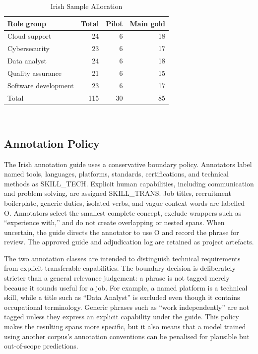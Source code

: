 \documentclass[conference]{IEEEtran}
\begin{document}
\begin{table}[!t]
\caption{Irish Sample Allocation}
\label{tab:corpus}
\centering
\small
\begin{tabular}{lrrr}
\toprule
Role group & Total & Pilot & Main gold \\
\midrule
Cloud support & 24 & 6 & 18 \\
Cybersecurity & 23 & 6 & 17 \\
Data analyst & 24 & 6 & 18 \\
Quality assurance & 21 & 6 & 15 \\
Software development & 23 & 6 & 17 \\
\midrule
Total & 115 & 30 & 85 \\
\bottomrule
\end{tabular}
\\[1mm]
\par\vspace{1mm}{\footnotesize Source: screened Irish posting inventory and final pilot/main-gold split.}
\end{table}

\subsection{Annotation Policy}
The Irish annotation guide uses a conservative boundary policy. Annotators label named tools, languages, platforms, standards, certifications, and technical methods as \textsf{SKILL\_TECH}. Explicit human capabilities, including communication and problem solving, are assigned \textsf{SKILL\_TRANS}. Job titles, recruitment boilerplate, generic duties, isolated verbs, and vague context words are labelled \textsf{O}. Annotators select the smallest complete concept, exclude wrappers such as ``experience with,'' and do not create overlapping or nested spans. When uncertain, the guide directs the annotator to use \textsf{O} and record the phrase for review. The approved guide and adjudication log are retained as project artefacts.

The two annotation classes are intended to distinguish technical requirements from explicit transferable capabilities. The boundary decision is deliberately stricter than a general relevance judgement: a phrase is not tagged merely because it sounds useful for a job. For example, a named platform is a technical skill, while a title such as ``Data Analyst'' is excluded even though it contains occupational terminology. Generic phrases such as ``work independently'' are not tagged unless they express an explicit capability under the guide. This policy makes the resulting spans more specific, but it also means that a model trained using another corpus's annotation conventions can be penalised for plausible but out-of-scope predictions.
\end{document}
